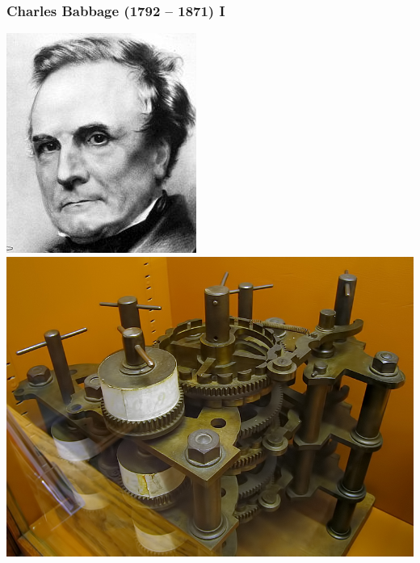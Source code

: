 \documentclass[utf8,10pt]{beamer}
\begin{document}
\begin{frame}
    \frametitle{Charles Babbage (1792 -- 1871) I}
    \begin{center}
        \includegraphics[scale=0.22]{./images/Babbage}
        \hfill
        \includegraphics[scale=0.22]{./images/BabbageDifferenceEngine}
    \end{center}
    
    \hfill \hyperlink{http://fr.wikipedia.org/wiki/Babbage}{}
\end{frame}
\end{document}
